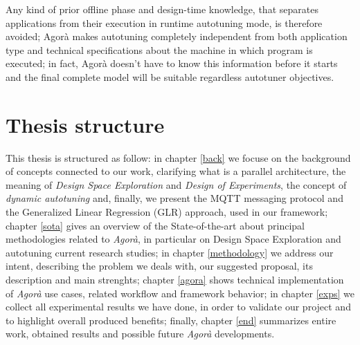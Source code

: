 Any kind of prior offline phase and design-time knowledge, that separates applications from their execution in runtime autotuning mode, is therefore avoided; Agorà makes autotuning completely independent from both application type and technical specifications about the machine in which program is executed; in fact, Agorà doesn't have to know this information before it starts and the final complete model will be suitable regardless autotuner objectives.





\section{Thesis structure}

This thesis is structured as follow: in chapter \ref{back} we focuse on the background of concepts connected to our work, clarifying what is a parallel architecture, the meaning of \textit{Design Space Exploration} and \textit{Design of Experiments}, the concept of \textit{dynamic autotuning} and, finally, we present the MQTT messaging protocol and the Generalized Linear Regression (GLR) approach, used in our framework; chapter \ref{sota} gives an overview of the State-of-the-art about principal methodologies related to \textit{Agorà}, in particular on Design Space Exploration and autotuning current research studies; in chapter \ref{methodology} we address our intent, describing the problem we deals with, our suggested proposal, its description and main strenghts; chapter \ref{agora} shows technical implementation of \textit{Agorà} use cases, related workflow and framework behavior; in chapter \ref{exps} we collect all experimental results we have done, in order to validate our project and to highlight overall produced benefits; finally, chapter \ref{end} summarizes entire work, obtained results and possible future \textit{Agorà} developments.
